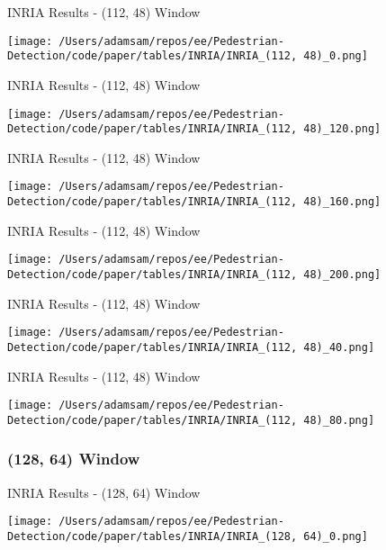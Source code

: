 \begin{table}
    \caption{INRIA Results - (112, 48) Window}
    \texttt{[image: /Users/adamsam/repos/ee/Pedestrian-Detection/code/paper/tables/INRIA/INRIA\_(112, 48)\_0.png]}
    \label{tab:INRIA_(112, 48)_0}
\end{table}

\begin{table}
    \caption{INRIA Results - (112, 48) Window}
    \texttt{[image: /Users/adamsam/repos/ee/Pedestrian-Detection/code/paper/tables/INRIA/INRIA\_(112, 48)\_120.png]}
    \label{tab:INRIA_(112, 48)_120}
\end{table}

\begin{table}
    \caption{INRIA Results - (112, 48) Window}
    \texttt{[image: /Users/adamsam/repos/ee/Pedestrian-Detection/code/paper/tables/INRIA/INRIA\_(112, 48)\_160.png]}
    \label{tab:INRIA_(112, 48)_160}
\end{table}

\begin{table}
    \caption{INRIA Results - (112, 48) Window}
    \texttt{[image: /Users/adamsam/repos/ee/Pedestrian-Detection/code/paper/tables/INRIA/INRIA\_(112, 48)\_200.png]}
    \label{tab:INRIA_(112, 48)_200}
\end{table}

\begin{table}
    \caption{INRIA Results - (112, 48) Window}
    \texttt{[image: /Users/adamsam/repos/ee/Pedestrian-Detection/code/paper/tables/INRIA/INRIA\_(112, 48)\_40.png]}
    \label{tab:INRIA_(112, 48)_40}
\end{table}

\begin{table}
    \caption{INRIA Results - (112, 48) Window}
    \texttt{[image: /Users/adamsam/repos/ee/Pedestrian-Detection/code/paper/tables/INRIA/INRIA\_(112, 48)\_80.png]}
    \label{tab:INRIA_(112, 48)_80}
\end{table}

\subsubsection*{(128, 64) Window}

\begin{table}
    \caption{INRIA Results - (128, 64) Window}
    \texttt{[image: /Users/adamsam/repos/ee/Pedestrian-Detection/code/paper/tables/INRIA/INRIA\_(128, 64)\_0.png]}
    \label{tab:INRIA_(128, 64)_0}
\end{table}

